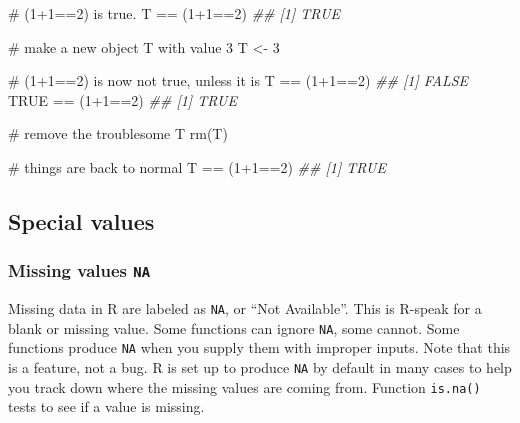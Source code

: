 \documentclass[
  13,
  letterpaper,
]{report}
\newenvironment{Shaded}{\begin{snugshade}}{\end{snugshade}}
\newcommand{\CommentTok}[1]{\textcolor[rgb]{0.37,0.37,0.37}{#1}}
\newcommand{\ConstantTok}[1]{\textcolor[rgb]{0.56,0.35,0.01}{#1}}
\newcommand{\DecValTok}[1]{\textcolor[rgb]{0.68,0.00,0.00}{#1}}
\newcommand{\DocumentationTok}[1]{\textcolor[rgb]{0.37,0.37,0.37}{\textit{#1}}}
\newcommand{\FunctionTok}[1]{\textcolor[rgb]{0.28,0.35,0.67}{#1}}
\newcommand{\NormalTok}[1]{\textcolor[rgb]{0.00,0.23,0.31}{#1}}
\newcommand{\OtherTok}[1]{\textcolor[rgb]{0.00,0.23,0.31}{#1}}
\newcommand{\SpecialCharTok}[1]{\textcolor[rgb]{0.37,0.37,0.37}{#1}}
\begin{document}
\begin{Shaded}
\begin{Highlighting}[]
\CommentTok{\# (1+1==2) is true.}
\NormalTok{T }\SpecialCharTok{==}\NormalTok{ (}\DecValTok{1}\SpecialCharTok{+}\DecValTok{1}\SpecialCharTok{==}\DecValTok{2}\NormalTok{)}
\DocumentationTok{\#\# [1] TRUE}

\CommentTok{\# make a new object T with value 3}
\NormalTok{T }\OtherTok{\textless{}{-}} \DecValTok{3}

\CommentTok{\# (1+1==2) is now not true, unless it is}
\NormalTok{T }\SpecialCharTok{==}\NormalTok{ (}\DecValTok{1}\SpecialCharTok{+}\DecValTok{1}\SpecialCharTok{==}\DecValTok{2}\NormalTok{)}
\DocumentationTok{\#\# [1] FALSE}
\ConstantTok{TRUE} \SpecialCharTok{==}\NormalTok{ (}\DecValTok{1}\SpecialCharTok{+}\DecValTok{1}\SpecialCharTok{==}\DecValTok{2}\NormalTok{)}
\DocumentationTok{\#\# [1] TRUE}

\CommentTok{\# remove the troublesome T}
\FunctionTok{rm}\NormalTok{(T)}

\CommentTok{\# things are back to normal}
\NormalTok{T }\SpecialCharTok{==}\NormalTok{ (}\DecValTok{1}\SpecialCharTok{+}\DecValTok{1}\SpecialCharTok{==}\DecValTok{2}\NormalTok{)}
\DocumentationTok{\#\# [1] TRUE}
\end{Highlighting}
\end{Shaded}

\subsection{Special values}\label{sec-03-type-spec}

\subsubsection{\texorpdfstring{Missing values
\texttt{NA}}{Missing values NA}}\label{sec-03-type-spec-na}

Missing data in R are labeled as \texttt{NA}, or ``Not Available''. This
is R-speak for a blank or missing value. Some functions can ignore
\texttt{NA}, some cannot. Some functions produce \texttt{NA} when you
supply them with improper inputs. Note that this is a feature, not a
bug. R is set up to produce \texttt{NA} by default in many cases to help
you track down where the missing values are coming from. Function
\texttt{is.na()} tests to see if a value is missing.
\end{document}
